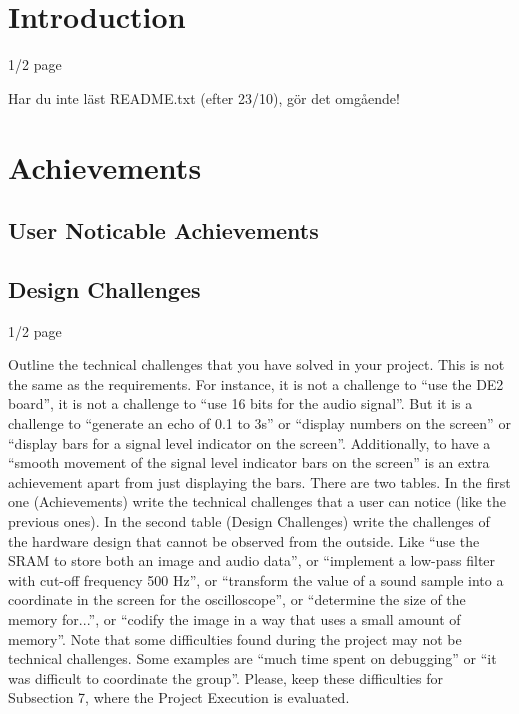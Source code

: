 
\pagestyle{plain}
\setcounter{page}{1}

\section{Introduction}\label{cha:intro}

1/2 page

{\LARGE Har du inte läst README.txt (efter 23/10), gör det omgående!}

\section{Achievements}\label{cha:achievements}
\subsection{User Noticable Achievements}\label{sec:userachievments}

\subsection{Design Challenges}\label{sec:designchallenges}

1/2 page

Outline the technical challenges that you have solved in your project. This is not the same as the requirements. For instance, it is not a challenge to “use the DE2 board”, it is not a challenge to “use 16 bits for the audio signal”. But it is a challenge to “generate an echo of 0.1 to 3s” or “display numbers on the screen” or “display bars for a signal level indicator on the screen”. Additionally, to have a “smooth movement of the signal level indicator bars on the screen” is an extra achievement apart from just displaying the bars. There are two tables. In the first one (Achievements) write the technical challenges that a user can notice (like the previous ones). In the second table (Design Challenges) write the challenges of the hardware design that cannot be observed from the outside. Like “use the SRAM to store both an image and audio data”, or “implement a low-pass filter with cut-off frequency 500 Hz”, or “transform the value of a sound sample into a coordinate in the screen for the oscilloscope”, or “determine the size of the memory for...”, or “codify the image in a way that uses a small amount of memory”. Note that some difficulties found during the project may not be technical challenges. Some examples are “much time spent on debugging” or “it was difficult to coordinate the group”. Please, keep these difficulties for Subsection 7, where the Project Execution is evaluated.

